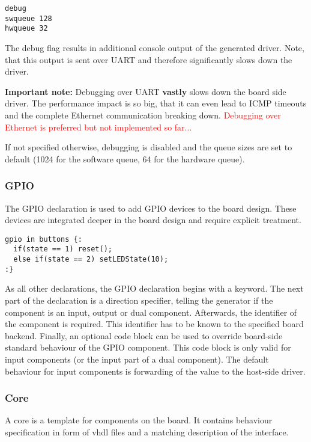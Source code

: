 \documentclass{report}
\begin{document}
\begin{lstlisting}[language=bdl]
debug
swqueue 128
hwqueue 32
\end{lstlisting}

The debug flag results in additional console output of the generated driver. Note, that this output is sent over UART and therefore significantly slows down the driver.

\textbf{Important note:} Debugging over UART \textbf{vastly} slows down the board side driver. The performance impact is so big, that it can even lead to ICMP timeouts and the complete Ethernet communication breaking down. \textcolor{red}{Debugging over Ethernet is preferred but not implemented so far...}

If not specified otherwise, debugging is disabled and the queue sizes are set to default (1024 for the software queue, 64 for the hardware queue).

\subsubsection{GPIO}
The GPIO declaration is used to add GPIO devices to the board design. These devices are integrated deeper in the board design and require explicit treatment.

\begin{lstlisting}[language=bdl]
gpio in buttons {:
  if(state == 1) reset();
  else if(state == 2) setLEDState(10);
:}
\end{lstlisting}

As all other declarations, the GPIO declaration begins with a keyword. The next part of the declaration is a direction specifier, telling the generator if the component is an input, output or dual component.
Afterwards, the identifier of the component is required. This identifier has to be known to the specified board backend.
Finally, an optional code block can be used to override board-side standard behaviour of the GPIO component. This code block is only valid for input components (or the input part of a dual component). The default behaviour for input components is forwarding of the value to the host-side driver.

\subsubsection{Core}
A core is a template for components on the board. It contains behaviour specification in form of vhdl files and a matching description of the interface.
\end{document}
